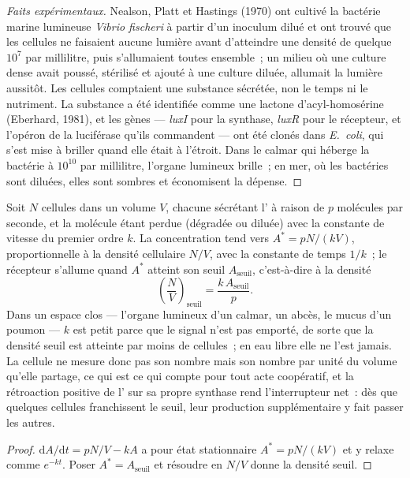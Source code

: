 \begin{proof}[Faits expérimentaux]
Nealson, Platt et Hastings (1970) ont cultivé la bactérie marine
lumineuse \emph{Vibrio fischeri} à partir d'un inoculum dilué et ont
trouvé que les cellules ne faisaient aucune lumière avant d'atteindre
une densité de quelque $10^{7}$ par millilitre, puis s'allumaient
toutes ensemble~; un milieu où une culture dense avait poussé,
stérilisé et ajouté à une culture diluée, allumait la lumière
aussitôt. Les cellules comptaient une substance sécrétée, non le temps
ni le nutriment. La substance a été identifiée comme une lactone
d'acyl-homosérine (Eberhard, 1981), et les gènes --- \emph{luxI} pour
la synthase, \emph{luxR} pour le récepteur, et l'opéron de la
luciférase qu'ils commandent --- ont été clonés dans \emph{E.~coli},
qui s'est mise à briller quand elle était à l'étroit. Dans le calmar
qui héberge la bactérie à $10^{10}$ par millilitre, l'organe lumineux
brille~; en mer, où les bactéries sont diluées, elles sont sombres et
économisent la dépense.
\end{proof}

\begin{proposition}\label{prop:b3:bacteriology:threshold}
Soit $N$ cellules dans un volume $V$, chacune sécrétant
l' à raison de $p$ molécules par seconde, et la molécule
étant perdue (dégradée ou diluée) avec la constante de vitesse du
premier ordre $k$. La concentration tend vers $A^{*} = pN/(kV)$,
proportionnelle à la densité cellulaire $N/V$, avec la constante de
temps $1/k$~; le récepteur s'allume quand $A^{*}$ atteint son seuil
$A_{\text{seuil}}$, c'est-à-dire à la densité
\[
\left(\frac{N}{V}\right)_{\text{seuil}} = \frac{k\,A_{\text{seuil}}}{p}.
\]
Dans un espace clos --- l'organe lumineux d'un calmar, un abcès, le
mucus d'un poumon --- $k$ est petit parce que le signal n'est pas
emporté, de sorte que la densité seuil est atteinte par moins de
cellules~; en eau libre elle ne l'est jamais. La cellule ne mesure donc
pas son nombre mais son nombre par unité du volume qu'elle partage, ce
qui est ce qui compte pour tout acte coopératif, et la rétroaction
positive de l' sur sa propre synthase rend l'interrupteur
net~: dès que quelques cellules franchissent le seuil, leur production
supplémentaire y fait passer les autres.
\end{proposition}
\begin{proof}
$\mathrm{d}A/\mathrm{d}t = pN/V - kA$ a pour état stationnaire $A^{*} =
pN/(kV)$ et y relaxe comme $e^{-kt}$. Poser $A^{*} = A_{\text{seuil}}$ et
résoudre en $N/V$ donne la densité seuil.
\end{proof}

